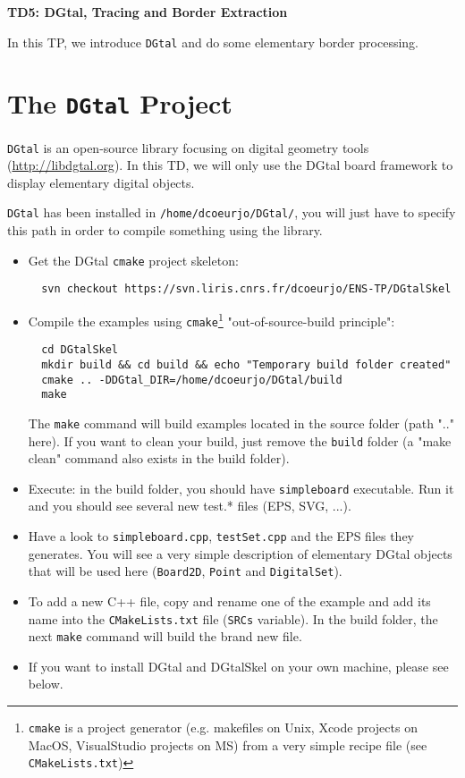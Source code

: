 \documentclass[a4paper, 11pt]{article}
\title{}
\author{}
\date{}
\begin{document}
\begin{center}
	\LARGE \textbf{TD5: DGtal, Tracing and Border Extraction}
\end{center}

\bigskip
\par In this TP, we introduce \texttt{DGtal} and do some elementary border processing.

\section*{The \texttt{DGtal} Project}

\par \texttt{DGtal} is an open-source library focusing on digital geometry tools (\url{http://libdgtal.org}). In this TD, we will only use the DGtal board framework to display elementary digital objects.

\par \texttt{DGtal} has been installed in \texttt{/home/dcoeurjo/DGtal/}, you will just have to specify this path in order to compile something using the library.
\begin{itemize}
	\item Get the DGtal \texttt{cmake} project skeleton: 
\begin{verbatim}
  svn checkout https://svn.liris.cnrs.fr/dcoeurjo/ENS-TP/DGtalSkel
\end{verbatim}
	\item Compile the examples using \texttt{cmake}\footnote{\texttt{cmake} is a project generator (e.g. makefiles on Unix, Xcode projects on MacOS, VisualStudio projects on MS) from a very simple recipe file (see \texttt{CMakeLists.txt})} "out-of-source-build principle":
\begin{verbatim}
  cd DGtalSkel
  mkdir build && cd build && echo "Temporary build folder created"
  cmake .. -DDGtal_DIR=/home/dcoeurjo/DGtal/build 
  make
\end{verbatim}
	The \texttt{make} command will build examples located in the source folder (path ".." here). If you want to clean your build, just remove the \texttt{build} folder (a "make clean" command also exists in the build folder).
	\item Execute: in the build folder, you should have \texttt{simpleboard} executable. Run it and you should see several new test.* files (EPS, SVG, ...).
	\item Have a look to  \texttt{simpleboard.cpp}, \texttt{testSet.cpp} and the EPS files they generates. You will see a very simple description of elementary DGtal objects that will be used here (\texttt{Board2D}, \texttt{Point} and \texttt{DigitalSet}).
	\item To add a new C++ file, copy and rename one of the example and add its name into the \texttt{CMakeLists.txt} file (\texttt{SRCs} variable). In the build folder, the next \texttt{make} command will build the brand new file.
	\item If you want to install DGtal and DGtalSkel on your own machine, please see below.
\end{itemize}
\end{document}
